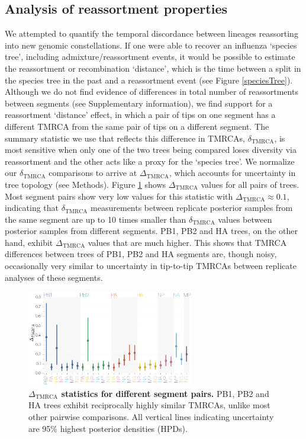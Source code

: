 \documentclass[11pt,oneside,letterpaper]{article}
\newcommand{\dtmrca}{\Delta_\mathrm{TMRCA}}
\newcommand{\undtmrca}{\delta_\mathrm{TMRCA}}
\begin{document}
\subsection*{Analysis of reassortment properties}
We attempted to quantify the temporal discordance between lineages reassorting into new genomic constellations.
If one were able to recover an influenza `species tree', including admixture/reassortment events, it would be possible to estimate the reassortment or recombination `distance', which is the time between a split in the species tree in the past and a reassortment event (see Figure \ref{speciesTree}).
Although we do not find evidence of differences in total number of reassortments between segments (see Supplementary information), we find support for a reassortment `distance' effect, in which a pair of tips on one segment has a different TMRCA from the same pair of tips on a different segment.
The summary statistic we use that reflects this difference in TMRCAs, $\undtmrca$, is most sensitive when only one of the two trees being compared loses diversity via reassortment and the other acts like a proxy for the `species tree'.
We normalize our $\undtmrca$ comparisons to arrive at $\dtmrca$, which accounts for uncertainty in tree topology (see Methods).
Figure \ref{deltaTMRCA} shows $\dtmrca$ values for all pairs of trees.
Most segment pairs show very low values for this statistic with $\dtmrca \approx 0.1$, indicating that $\undtmrca$ measurements between replicate posterior samples from the same segment are up to 10 times smaller than $\undtmrca$ values between posterior samples from different segments.
PB1, PB2 and HA trees, on the other hand, exhibit $\dtmrca$ values that are much higher.
This shows that TMRCA differences between trees of PB1, PB2 and HA segments are, though noisy, occasionally very similar to uncertainty in tip-to-tip TMRCAs between replicate analyses of these segments.

\begin{figure}[h]
	\centering
	\includegraphics[width=0.65\textwidth]{figures/InfB_normalizedMuDeltaTMRCA.png}
	\caption{\textbf{$\dtmrca$ statistics for different segment pairs.}
PB1, PB2 and HA trees exhibit reciprocally highly similar TMRCAs, unlike most other pairwise comparisons.
All vertical lines indicating uncertainty are 95\% highest posterior densities (HPDs).}
	\label{deltaTMRCA}
\end{figure}
\end{document}
